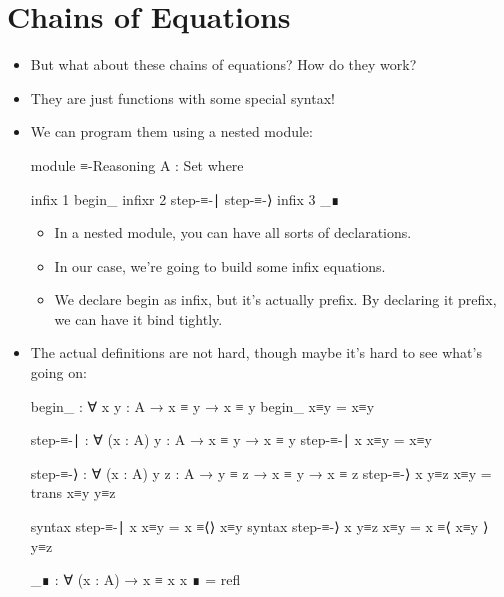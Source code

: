\documentclass{lecturenotes}
\begin{document}
\section{Chains of Equations}
\label{sec:chains-equations}

\begin{itemize}
\item But what about these chains of equations?
  How do they work?
\item They are just functions with some special syntax!
\item We can program them using a nested module:
\begin{code}
module ≡-Reasoning {A : Set} where

  infix 1 begin_
  infixr 2 step-≡-∣ step-≡-⟩
  infix 3 _∎
\end{code}
\begin{itemize}
\item In a nested module, you can have all sorts of declarations.
\item In our case, we're going to build some infix equations.
\item We declare \textsf{begin} as infix, but it's actually prefix.
  By declaring it prefix, we can have it bind tightly.
\end{itemize}
\item The actual definitions are not hard, though maybe it's hard to see what's going on:
\begin{code}
  begin_ : ∀ {x y : A} → x ≡ y → x ≡ y
  begin_ x≡y = x≡y

  step-≡-∣ : ∀ (x : A) {y : A} → x ≡ y → x ≡ y
  step-≡-∣ x x≡y = x≡y

  step-≡-⟩ : ∀ (x : A) {y z : A} → y ≡ z → x ≡ y → x ≡ z
  step-≡-⟩ x y≡z x≡y = trans x≡y y≡z

  syntax step-≡-∣ x x≡y = x ≡⟨⟩ x≡y
  syntax step-≡-⟩ x y≡z x≡y = x ≡⟨ x≡y ⟩ y≡z

  _∎ : ∀ (x : A) → x ≡ x
  x ∎ = refl


\end{code}
\end{itemize}
\end{document}
